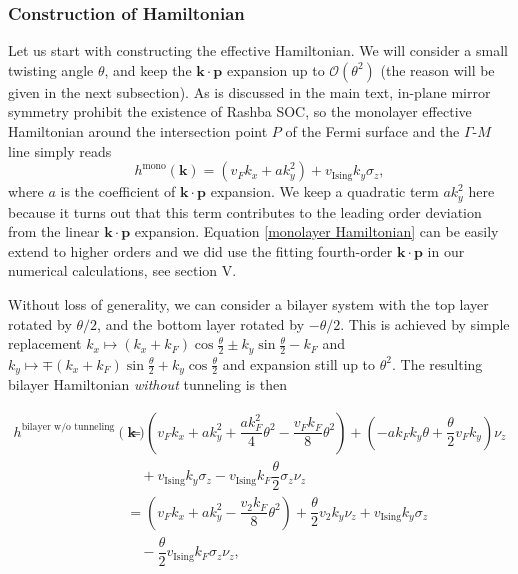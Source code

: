 \begin{subappendices}
	\subsubsection{Construction of Hamiltonian}
	Let us start with constructing the effective Hamiltonian. We will consider a small twisting angle $\theta$, and keep the $\bm{k\cdot p}$ expansion up to $\mathcal{O}(\theta^2)$ (the reason will be given in the next subsection). As is discussed in the main text, in-plane mirror symmetry prohibit the existence of Rashba SOC, so the monolayer effective Hamiltonian around the intersection point $P$ of the Fermi surface and the $\Gamma$-$M$ line simply reads
	\begin{equation}\label{monolayer Hamiltonian}
		h^{\text{mono}}(\bm{k})=(v_F k_x + a k_y^2)+v_{\text{Ising}} k_y \sigma_z,
	\end{equation}
	where $a$ is the coefficient of $\bm{k\cdot p}$ expansion. We keep a quadratic term $ak_y^2$ here because it turns out that this term contributes to the leading order deviation from the linear $\bm{k\cdot p}$ expansion. Equation \eqref{monolayer Hamiltonian} can be easily extend to higher orders and we did use the fitting fourth-order $\bm{k\cdot p}$ in our numerical calculations, see section V.\par
	Without loss of generality, we can consider a bilayer system with the top layer rotated by $\theta/2$, and the bottom layer rotated by $-\theta/2$. This is achieved by simple replacement $k_x\mapsto(k_x+k_F)\cos\frac{\theta}{2}\pm k_y\sin\frac{\theta}{2}-k_F$ and $k_y\mapsto\mp(k_x+k_F)\sin\frac{\theta}{2}+k_y\cos\frac{\theta}{2}$ and expansion still up to $\theta^2$. The resulting bilayer Hamiltonian \emph{without} tunneling is then

	\begin{align}\label{bilayer Hamiltonian without Tunneling}
		h^{\text{bilayer w/o tunneling}}(\bm{k}) & =\left(v_F k_x+ak_y^2+\dfrac{ak_F^2}{4}\theta^2-\dfrac{v_F k_F}{8}\theta^2\right)+\left(-ak_F k_y \theta+\dfrac{\theta}{2}v_F k_y\right)\nu_z\nonumber \\
		                                         & \quad+v_{\text{Ising}} k_y\sigma_z-v_{\text{Ising}} k_F\dfrac{\theta}{2}\sigma_z\nu_z \nonumber                                                        \\
		                                         & =\left(v_F k_x+ak_y^2-\dfrac{v_2 k_F}{8}\theta^2\right)+\dfrac{\theta}{2}v_2k_y\nu_z+v_{\text{Ising}} k_y\sigma_z\nonumber                             \\
		                                         & \quad-\dfrac{\theta}{2}v_{\text{Ising}} k_F\sigma_z\nu_z,
	\end{align}


\end{subappendices}
